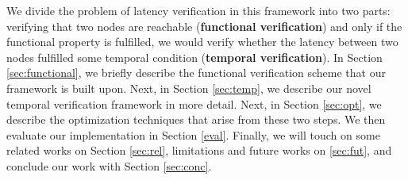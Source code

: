 


We divide the problem of latency verification in this framework into two parts: 
verifying that two nodes are reachable (\textbf{functional verification}) and only if 
the functional property is fulfilled, we would verify whether the latency between 
two nodes fulfilled some temporal condition (\textbf{temporal verification}).
In Section \ref{sec:functional}, we briefly describe the functional verification scheme that 
our framework is built upon. 
Next, in Section \ref{sec:temp}, we describe our novel temporal verification framework 
in more detail.
Next, in Section \ref{sec:opt}, we describe the optimization techniques that arise from 
these two steps.
We then evaluate our implementation in Section \ref{eval}.
Finally, we will touch on some related works on Section \ref{sec:rel}, limitations and future 
works on \ref{sec:fut}, and conclude our work with Section \ref{sec:conc}.